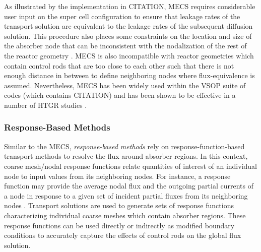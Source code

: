 As illustrated by the implementation in CITATION, \gls{MECS} requires
considerable user input on the super cell configuration to ensure that leakage
rates of the transport solution are equivalent to the leakage rates of the
subsequent diffusion solution. This procedure also places some constraints on
the location and size of the absorber node that can be inconsistent
with the nodalization of the rest of the reactor geometry
\cite{ougouag_transport_2010}. \gls{MECS} is also incompatible with
reactor geometries which contain control rods that are too close to each other
such that there is not enough distance in between to define neighboring nodes
where flux-equivalence is assumed. Nevertheless, \gls{MECS} has been widely
used within the \gls{VSOP} suite of codes (which contains CITATION) and has
been shown to be effective in a number of \gls{HTGR} studies
\cite{fen_modelling_1992, reitsma_evaluating_2003, mulder_neutronics_2020}.

\subsubsection{Response-Based Methods}

Similar to the \gls{MECS}, \textit{response-based methods} rely on response-function-based
transport methods to resolve the flux around absorber regions. In this context, coarse mesh/nodal
response functions relate quantities of interest of an individual node to input values from its
neighboring nodes. For instance, a response function may provide the average nodal flux and the
outgoing partial currents of a node in response to a given set of incident
partial fluxes from its neighboring nodes \cite{ougouag_transport_2010}. Transport solutions are
used to generate sets of response functions characterizing individual coarse meshes which contain
absorber regions. These response functions can be used directly or indirectly as modified boundary
conditions to accurately capture the effects of control rods on the global flux solution.


